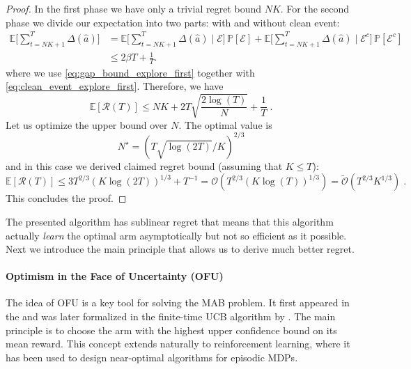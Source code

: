 \documentclass{article}
\numberwithin{equation}{section}
\newcommand{\E}{\mathbb E}
\newcommand{\eqsp}{\;}
\begin{document}
\begin{proof}
    In the first phase we have only a trivial regret bound $NK$. For the second phase we divide our expectation into two parts: with and without clean event:
\begin{align*}
\mathbb{E}\big[ \textstyle\sum_{t = NK+1}^{T} \Delta(\hat{a}) \big] 
&= \mathbb{E}\big[ \textstyle\sum_{t = NK+1}^{T} \Delta(\hat{a}) \mid \mathcal{E} \big] 
   \, \mathbb{P}[\mathcal{E}] 
 +
   \mathbb{E}\big[ \textstyle\sum_{t = NK+1}^{T} \Delta(\hat{a}) \mid \mathcal{E}^c \big] 
   \, \mathbb{P}[\mathcal{E}^c] \\
&\le 2\beta T + \tfrac{1}{T}.
\end{align*}
where we use \eqref{eq:gap_bound_explore_first} together with \eqref{eq:clean_event_explore_first}.
    Therefore, we have
    \[
        \E[\mathcal{R}(T)] \leq NK + 2T \sqrt{\frac{2\log(T)}{N}} + \frac{1}{T}\eqsp.
    \]
    Let us optimize the upper bound over $N$. The optimal value is \[N^\star = (T\sqrt{\log(2T)}/K)^{2/3}\] and in this case we derived claimed regret bound (assuming that $K \leq T$):
    \[
        \E[\mathcal{R}(T)] \leq 3 T^{2/3} (K \log(2T))^{1/3} + T^{-1} = \mathcal{O}(T^{2/3} (K \log(T))^{1/3}) = \widetilde{\mathcal{O}}(T^{2/3} K^{1/3})\eqsp.
    \]
    This concludes the proof.
\end{proof}

The presented algorithm has sublinear regret that means that this algorithm actually \textit{learn} the optimal arm asymptotically but not so efficient as it possible. Next we introduce the main principle that allows us to derive much better regret.

\paragraph{Optimism in the Face of Uncertainty (OFU)}
The idea of OFU is a key tool for solving the MAB  problem. It first appeared in the  \cite{lai1985asymptotically} and was later formalized in the finite-time UCB algorithm by \citet{auer2002finite}. The main principle is to choose the arm with the highest upper confidence bound on its mean reward. This concept extends naturally to reinforcement learning, where it has been used to design near-optimal algorithms for episodic MDPs.
\end{document}
